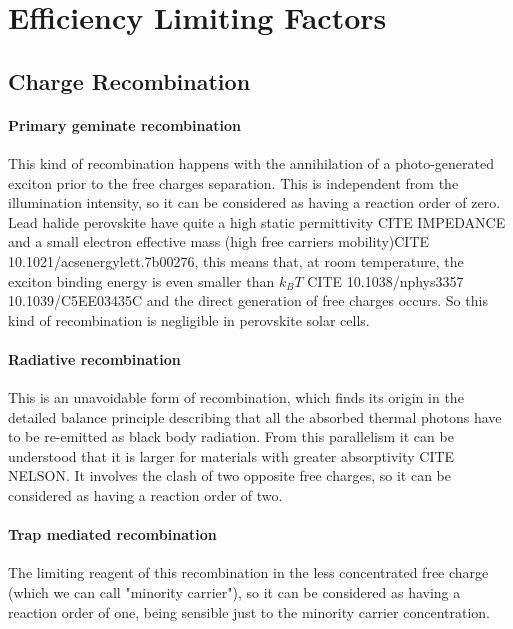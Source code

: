 \section{Efficiency Limiting Factors}

\subsection{Charge Recombination}

\paragraph{Primary geminate recombination} \label{intro_geminate} This kind of recombination happens with the annihilation of a photo-generated exciton prior to the free charges separation. This is independent from the illumination intensity, so it can be considered as having a reaction order of zero. Lead halide perovskite have quite a high static permittivity CITE IMPEDANCE and a small electron effective mass (high free carriers mobility)CITE 10.1021/acsenergylett.7b00276, this means that, at room temperature, the exciton binding energy is even smaller than $k_BT$ CITE 10.1038/nphys3357 10.1039/C5EE03435C and the direct generation of free charges occurs. So this kind of recombination is negligible in perovskite solar cells. %

\paragraph{Radiative recombination} This is an unavoidable form of recombination, which finds its origin in the detailed balance principle describing that all the absorbed thermal photons have to be re-emitted as black body radiation. From this parallelism it can be understood that it is larger for materials with greater absorptivity CITE NELSON. It involves the clash of two opposite free charges, so it can be considered as having a reaction order of two.

\paragraph{Trap mediated recombination} The limiting reagent of this recombination in the less concentrated free charge (which we can call "minority carrier"), so it can be considered as having a reaction order of one, being sensible just to the minority carrier concentration.

